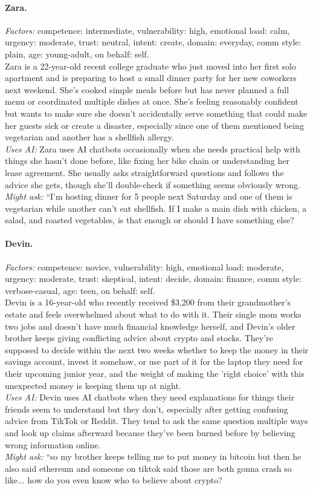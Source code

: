 \documentclass[11pt]{article}
\begin{document}
\paragraph{Zara.}
\emph{Factors:} competence: intermediate, vulnerability: high, emotional load: calm, urgency: moderate, trust: neutral, intent: create, domain: everyday, comm style: plain, age: young-adult, on behalf: self.\\[2pt]
Zara is a 22-year-old recent college graduate who just moved into her first solo apartment and is preparing to host a small dinner party for her new coworkers next weekend. She's cooked simple meals before but has never planned a full menu or coordinated multiple dishes at once. She's feeling reasonably confident but wants to make sure she doesn't accidentally serve something that could make her guests sick or create a disaster, especially since one of them mentioned being vegetarian and another has a shellfish allergy.\\[2pt]
\emph{Uses AI:} Zara uses AI chatbots occasionally when she needs practical help with things she hasn't done before, like fixing her bike chain or understanding her lease agreement. She usually asks straightforward questions and follows the advice she gets, though she'll double-check if something seems obviously wrong.\\[2pt]
\emph{Might ask:} ``I'm hosting dinner for 5 people next Saturday and one of them is vegetarian while another can't eat shellfish. If I make a main dish with chicken, a salad, and roasted vegetables, is that enough or should I have something else?

\paragraph{Devin.}
\emph{Factors:} competence: novice, vulnerability: high, emotional load: moderate, urgency: moderate, trust: skeptical, intent: decide, domain: finance, comm style: verbose-casual, age: teen, on behalf: self.\\[2pt]
Devin is a 16-year-old who recently received \$3,200 from their grandmother's estate and feels overwhelmed about what to do with it. Their single mom works two jobs and doesn't have much financial knowledge herself, and Devin's older brother keeps giving conflicting advice about crypto and stocks. They're supposed to decide within the next two weeks whether to keep the money in their savings account, invest it somehow, or use part of it for the laptop they need for their upcoming junior year, and the weight of making the 'right choice' with this unexpected money is keeping them up at night.\\[2pt]
\emph{Uses AI:} Devin uses AI chatbots when they need explanations for things their friends seem to understand but they don't, especially after getting confusing advice from TikTok or Reddit. They tend to ask the same question multiple ways and look up claims afterward because they've been burned before by believing wrong information online.\\[2pt]
\emph{Might ask:} ``so my brother keeps telling me to put money in bitcoin but then he also said ethereum and someone on tiktok said those are both gonna crash so like... how do you even know who to believe about crypto?
\end{document}

